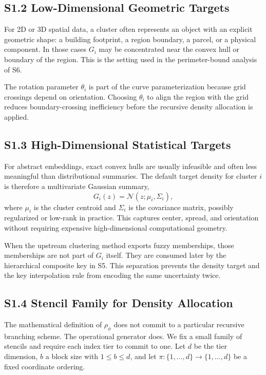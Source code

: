 \documentclass[11pt]{article}
\newcommand{\rhophi}{\rho_{\phi}}
\begin{document}
\subsection*{S1.2 Low-Dimensional Geometric Targets}
For 2D or 3D spatial data, a cluster often represents an object with an explicit geometric shape: a building footprint, a region boundary, a parcel, or a physical component. In those cases $G_i$ may be concentrated near the convex hull or boundary of the region. This is the setting used in the perimeter-bound analysis of S6.

The rotation parameter $\theta_i$ is part of the curve parameterization because grid crossings depend on orientation. Choosing $\theta_i$ to align the region with the grid reduces boundary-crossing inefficiency before the recursive density allocation is applied.

\subsection*{S1.3 High-Dimensional Statistical Targets}
For abstract embeddings, exact convex hulls are usually infeasible and often less meaningful than distributional summaries. The default target density for cluster $i$ is therefore a multivariate Gaussian summary,
\[
G_i(z)=\mathcal N(z;\mu_i,\Sigma_i),
\]
where $\mu_i$ is the cluster centroid and $\Sigma_i$ is the covariance matrix, possibly regularized or low-rank in practice. This captures center, spread, and orientation without requiring expensive high-dimensional computational geometry.

When the upstream clustering method exports fuzzy memberships, those memberships are not part of $G_i$ itself. They are consumed later by the hierarchical composite key in S5. This separation prevents the density target and the key interpolation rule from encoding the same uncertainty twice.

\subsection*{S1.4 Stencil Family for Density Allocation}
\label{sec:si-stencils}
The mathematical definition of $\rhophi$ does not commit to a particular recursive branching scheme. The operational generator does. We fix a small family of stencils and require each index tier to commit to one. Let $d$ be the tier dimension, $b$ a block size with $1\leq b\leq d$, and let $\pi:\{1,\dots,d\}\to\{1,\dots,d\}$ be a fixed coordinate ordering.
\end{document}
